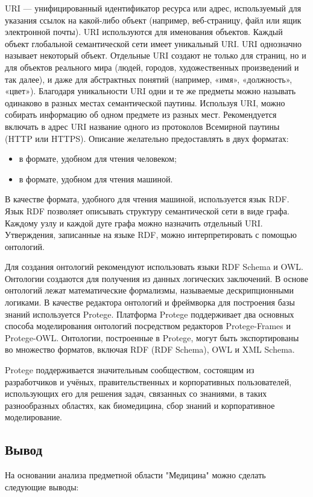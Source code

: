 URI — унифицированный идентификатор ресурса или адрес, используемый для указания ссылок на какой-либо объект (например, веб-страницу, файл или ящик электронной почты). URI используются для именования объектов. Каждый объект глобальной семантической сети имеет уникальный URI. URI однозначно называет некоторый объект. Отдельные URI создают не только для страниц, но и для объектов реального мира (людей, городов, художественных произведений и так далее), и даже для абстрактных понятий (например, «имя», «должность», «цвет»). Благодаря уникальности URI одни и те же предметы можно называть одинаково в разных местах семантической паутины. Используя URI, можно собирать информацию об одном предмете из разных мест. Рекомендуется включать в адрес URI название одного из протоколов Всемирной паутины (HTTP или HTTPS).
Описание желательно предоставлять в двух форматах:
\begin{itemize}
	\item в  формате, удобном для чтения человеком;
	\item в формате, удобном для чтения машиной.
\end{itemize}

В качестве формата, удобного для чтения машиной, используется язык RDF. Язык RDF позволяет описывать структуру семантической сети в виде графа. Каждому узлу и каждой дуге графа можно назначить отдельный URI. Утверждения, записанные на языке RDF, можно интерпретировать с помощью онтологий.

Для создания онтологий рекомендуют использовать языки RDF Schema и OWL. Онтологии создаются для получения из данных логических заключений. В основе онтологий лежат математические формализмы, называемые дескрипционными логиками.
В качестве редактора онтологий и фреймворка для построения базы знаний используется Protege.
Платформа Protege поддерживает два основных способа моделирования онтологий посредством редакторов Protege-Frames и Protege-OWL. Онтологии, построенные в Protege, могут быть экспортированы во множество форматов, включая RDF (RDF Schema), OWL и XML Schema.

Protege поддерживается значительным сообществом, состоящим из разработчиков и учёных, правительственных и корпоративных пользователей, использующих его для решения задач, связанных со знаниями, в таких разнообразных областях, как биомедицина, сбор знаний и корпоративное моделирование.

\subsection{Вывод}
На основании анализа предметной области "Медицина" можно сделать следующие выводы:

